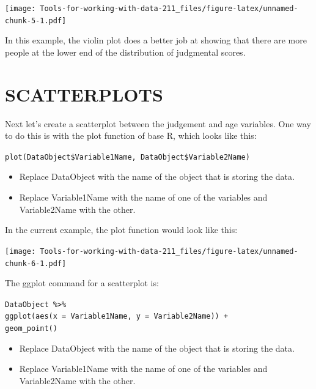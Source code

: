 \documentclass[
]{book}
\newenvironment{Shaded}{\begin{snugshade}}{\end{snugshade}}
\newcommand{\KeywordTok}[1]{\textcolor[rgb]{0.13,0.29,0.53}{\textbf{#1}}}
\newcommand{\NormalTok}[1]{#1}
\newcommand{\OperatorTok}[1]{\textcolor[rgb]{0.81,0.36,0.00}{\textbf{#1}}}
\providecommand{\tightlist}{%
  \setlength{\itemsep}{0pt}\setlength{\parskip}{0pt}}
\begin{document}
\texttt{[image: Tools-for-working-with-data-211\_files/figure-latex/unnamed-chunk-5-1.pdf]}

In this example, the violin plot does a better job at showing that there are more people at the lower end of the distribution of judgmental scores.

\hypertarget{scatterplots}{%
\section{SCATTERPLOTS}\label{scatterplots}}

Next let's create a scatterplot between the judgement and age variables. One way to do this is with the plot function of base R, which looks like this:

\texttt{plot(DataObject\$Variable1Name,\ DataObject\$Variable2Name)}

\begin{itemize}
\tightlist
\item
  Replace DataObject with the name of the object that is storing the data.\\
\item
  Replace Variable1Name with the name of one of the variables and Variable2Name with the other.
\end{itemize}

In the current example, the plot function would look like this:

\begin{Shaded}
\end{Shaded}

\texttt{[image: Tools-for-working-with-data-211\_files/figure-latex/unnamed-chunk-6-1.pdf]}

The ggplot command for a scatterplot is:

\texttt{DataObject\ \%\textgreater{}\%}\\
\texttt{ggplot(aes(x\ =\ Variable1Name,\ y\ =\ Variable2Name))\ +}~\\
\texttt{geom\_point()}

\begin{itemize}
\tightlist
\item
  Replace DataObject with the name of the object that is storing the data.\\
\item
  Replace Variable1Name with the name of one of the variables and Variable2Name with the other.
\end{itemize}
\end{document}
